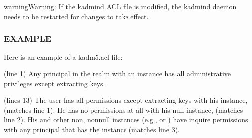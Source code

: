 \documentclass[letterpaper,10pt,english]{sphinxmanual}
\begin{document}
\begin{sphinxadmonition}{warning}{Warning:}
\sphinxAtStartPar
If the kadmind ACL file is modified, the kadmind daemon needs to be
restarted for changes to take effect.
\end{sphinxadmonition}


\subsubsection{EXAMPLE}
\label{\detokenize{admin/conf_files/kadm5_acl:example}}
\sphinxAtStartPar
Here is an example of a kadm5.acl file:

\begin{sphinxVerbatim}[commandchars=\\\{\}]
                                   
                             
           
                  
                                   
               
\end{sphinxVerbatim}

\sphinxAtStartPar
(line 1) Any principal in the  realm with an
 instance has all administrative privileges except extracting
keys.

\sphinxAtStartPar
(lines 1\sphinxhyphen{}3) The user  has all permissions except
extracting keys with his  instance,
 (matches line 1).  He has no
permissions at all with his null instance, 
(matches line 2).  His  and other non\sphinxhyphen{}, non\sphinxhyphen{}null
instances (e.g.,  or ) have inquire permissions
with any principal that has the instance  (matches line 3).
\end{document}
